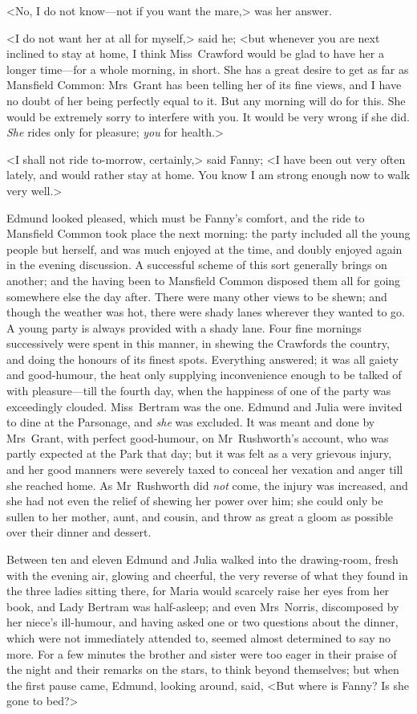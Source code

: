 <No, I do not know—not if you want the mare,> was her answer.

<I do not want her at all for myself,> said he; <but whenever you are next inclined to stay at home, I think Miss~Crawford would be glad to have her a longer time—for a whole morning, in short. She has a great desire to get as far as Mansfield Common: Mrs~Grant has been telling her of its fine views, and I have no doubt of her being perfectly equal to it. But any morning will do for this. She would be extremely sorry to interfere with you. It would be very wrong if she did. \textit{She}  rides only for pleasure; \textit{you}  for health.>

<I shall not ride to-morrow, certainly,> said Fanny; <I have been out very often lately, and would rather stay at home. You know I am strong enough now to walk very well.>

Edmund looked pleased, which must be Fanny's comfort, and the ride to Mansfield Common took place the next morning: the party included all the young people but herself, and was much enjoyed at the time, and doubly enjoyed again in the evening discussion. A successful scheme of this sort generally brings on another; and the having been to Mansfield Common disposed them all for going somewhere else the day after. There were many other views to be shewn; and though the weather was hot, there were shady lanes wherever they wanted to go. A young party is always provided with a shady lane. Four fine mornings successively were spent in this manner, in shewing the Crawfords the country, and doing the honours of its finest spots. Everything answered; it was all gaiety and good-humour, the heat only supplying inconvenience enough to be talked of with pleasure—till the fourth day, when the happiness of one of the party was exceedingly clouded. Miss~Bertram was the one. Edmund and Julia were invited to dine at the Parsonage, and \textit{she}  was excluded. It was meant and done by Mrs~Grant, with perfect good-humour, on Mr~Rushworth's account, who was partly expected at the Park that day; but it was felt as a very grievous injury, and her good manners were severely taxed to conceal her vexation and anger till she reached home. As Mr~Rushworth did \textit{not}  come, the injury was increased, and she had not even the relief of shewing her power over him; she could only be sullen to her mother, aunt, and cousin, and throw as great a gloom as possible over their dinner and dessert.

Between ten and eleven Edmund and Julia walked into the drawing-room, fresh with the evening air, glowing and cheerful, the very reverse of what they found in the three ladies sitting there, for Maria would scarcely raise her eyes from her book, and Lady Bertram was half-asleep; and even Mrs~Norris, discomposed by her niece's ill-humour, and having asked one or two questions about the dinner, which were not immediately attended to, seemed almost determined to say no more. For a few minutes the brother and sister were too eager in their praise of the night and their remarks on the stars, to think beyond themselves; but when the first pause came, Edmund, looking around, said, <But where is Fanny? Is she gone to bed?>

